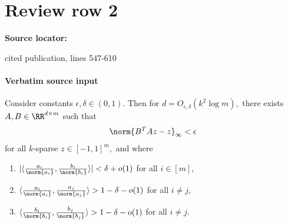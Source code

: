 \documentclass[10pt]{article}
\begin{document}
\section*{Review row 2}
\textbf{Source locator:} {\footnotesize\raggedright cited publication, lines 547-\allowbreak{}610\par}
\paragraph{Verbatim source input}
\begin{ReviewVerbatim}
\begin{proposition}\label{prop:geometry-1}
    Consider constants $\epsilon, \delta\in (0,1)$. Then for $d = O_{\epsilon,\delta}(k^2\log m),$ there exists $A,B\in \RR^{d\times m}$ such that
    \begin{equation}
        \norm{B^TAz - z}_\infty < \epsilon
    \end{equation}
    for all $k$-sparse $z\in [-1,1]^m,$ and where
    \begin{enumerate}
        \item[(i)] $|\langle \frac{a_i}{\norm{a_i}}, \frac{b_i}{\norm{b_i}}\rangle| < \delta + o(1)$ for all $i\in [m]$,
        \item[(ii)] $\langle \frac{a_i}{\norm{a_i}}, \frac{a_j}{\norm{a_j}}\rangle
        > 1 - \delta - o(1)$ for all $i\neq j$,
        \item[(iii)] $\langle \frac{b_i}{\norm{b_i}}, \frac{b_j}{\norm{b_j}}\rangle > 1 - \delta - o(1)$ for all $i\neq j$.
    \end{enumerate}
\end{proposition}


\end{ReviewVerbatim}
\end{document}
